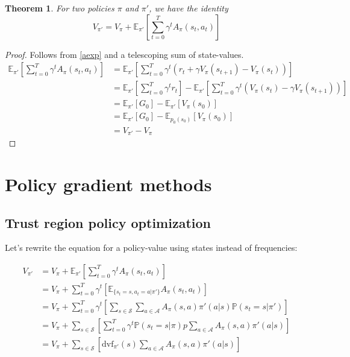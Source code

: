 \documentclass[10pt]{article}
\numberwithin{equation}{subsection}
\newcommand{\MS}{\ensuremath{\mathcal{S}}}
\newcommand{\MA}{\ensuremath{\mathcal{A}}}
\newcommand{\E}{\ensuremath{\mathbb{E}}}
\newcommand{\PR}{\ensuremath{\mathbb{P}}}
\newcommand{\mpi}{\ensuremath{\pi}\xspace}
\newcommand{\mpip}{{\ensuremath{\pi'}}\xspace}
\newcommand{\dvf}{\ensuremath{\textrm{dvf}}}
\theoremstyle{plain}
\newtheorem{theorem}{Theorem}[subsection]
\theoremstyle{definition}
\begin{document}
\begin{theorem}
For two policies \mpi and \mpip, we have the identity
$$
V_\mpip = V_\mpi + \E_\mpip \left[ \sum_{t=0}^T \gamma^t A_\mpi(s_t, a_t) \right]
$$

\end{theorem}
\begin{proof}
Follows from \cref{aexp} and a telescoping sum of state-values.
\begin{align*}
\E_\mpip \left[ \sum_{t=0}^T \gamma^t A_\mpi(s_t, a_t) \right] &= 
\E_\mpip \left[ \sum_{t=0}^T \gamma^t \left( r_t + \gamma V_\mpi(s_{t+1}) - V_\mpi(s_t) \right) \right] \\
&= \E_\mpip \left[ \sum_{t=0}^T \gamma^t r_t \right]
- \E_\mpip \left[ \sum_{t=0}^T \gamma^t \left(V_\mpi(s_t) - \gamma V_\mpi(s_{t+1}) \right) \right] \\ 
&= \E_\mpip \left[ G_0 \right]
- \E_\mpip \left[ V_\mpi(s_0) \right] \\ 
&= \E_\mpip \left[ G_0 \right]
- \E_{p_0(s_0)} \left[ V_\mpi(s_0) \right] \\ 
&= V_\mpip - V_\mpi
\end{align*} 
\end{proof}



\section{Policy gradient methods}

\subsection{Trust region policy optimization}

Let's rewrite the equation for a policy-value using states instead of frequencies:

\begin{align}
V_\mpip &= V_\mpi + \E_\mpip \left[ \sum_{t=0}^T \gamma^t A_\mpi(s_t, a_t) \right] \\
&= V_\mpi +  \sum_{t=0}^T \gamma^t  \left[ \E_{\{s_t = s, a_t = a | \mpip\}}  A_\mpi(s_t, a_t) \right] \\
&= V_\mpi +  \sum_{t=0}^T \gamma^t  \left[ \sum_{s \in \MS} \sum_{a \in \MA}  A_\mpi(s, a) \mpip(a | s)
\PR(s_t = s | \mpip) \right] \\
&= V_\mpi +  \sum_{s \in \MS} \left[   \sum_{t=0}^T \gamma^t \PR(s_t = s | \mpi)p    \sum_{a \in \MA}  A_\mpi(s, a) \mpip(a | s) \right]
 \\
 \label{trpo:value-improvement}
 &= V_\mpi +  \sum_{s \in \MS} \left[   \dvf_\mpip(s)   \sum_{a \in \MA}  A_\mpi(s, a) \mpip(a | s) \right]
\end{align}
\end{document}
